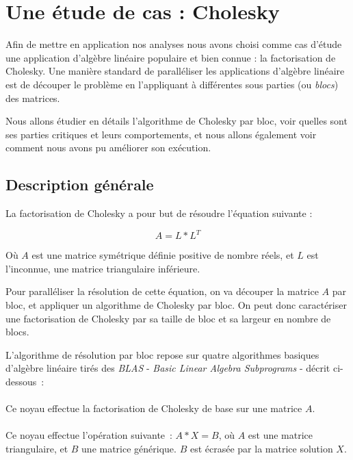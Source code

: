 \section{Une étude de cas : Cholesky}\label{sec:contribs:apps:cholesky}

Afin de mettre en application nos analyses nous avons choisi comme cas d'étude une application d'algèbre linéaire populaire et bien connue : la factorisation de Cholesky.
Une manière standard de paralléliser les applications d'algèbre linéaire est de découper le problème en l'appliquant à différentes sous parties (ou \emph{blocs}) des matrices.

Nous allons étudier en détails l'algorithme de Cholesky par bloc, voir quelles sont ses parties critiques et leurs comportements, et nous allons également voir comment nous avons pu améliorer son exécution.


\subsection{Description générale}

La factorisation de Cholesky a pour but de résoudre l'équation suivante :

$$ A = L*L^T$$

Où $A$ est une matrice symétrique définie positive de nombre réels, et $L$ est l'inconnue, une matrice triangulaire inférieure.

Pour paralléliser la résolution de cette équation, on va découper la matrice $A$ par bloc, et appliquer un algorithme de Cholesky par bloc.
On peut donc caractériser une factorisation de Cholesky par sa taille de bloc et sa largeur en nombre de blocs.

L'algorithme de résolution par bloc repose sur quatre algorithmes basiques d'algèbre linéaire tirés des \emph{BLAS} - \emph{Basic Linear Algebra Subprograms} - décrit ci-dessous~:


\paragraph{}

Ce noyau effectue la factorisation de Cholesky de base sur une matrice $A$.

\paragraph{}

Ce noyau effectue l'opération suivante~: $A*X = B$, où $A$ est une matrice triangulaire, et $B$ une matrice générique. $B$ est écrasée par la matrice solution $X$.

